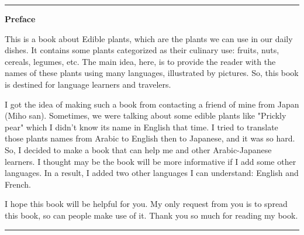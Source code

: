%
%
%

\newpage
\hrule
{}
{}
\begin{flushright}
{\huge \textbf{Preface}}
\end{flushright}
\vspace{1cm}

This is a book about Edible plants, which are the plants we can use in our daily dishes. 
It contains some plants categorized as their culinary use: fruits, nuts, cereals, legumes, etc. 
The main idea, here, is to provide the reader with the names of these plants using many languages, illustrated by pictures.
So, this book is destined for language learners and travelers.

I got the idea of making such a book from contacting a friend of mine from Japan (Miho san). 
Sometimes, we were talking about some edible plants like "Prickly pear" which I didn't know its name in English that time. 
I tried to translate those plants names from Arabic to English then to Japanese, and it was so hard.
So, I decided to make a book that can help me and other Arabic-Japanese learners. 
I thought may be the book will be more informative if I add some other languages.
In a result, I added two other languages I can understand: English and French.

I hope this book will be helpful for you. 
My only request from you is to spread this book, so can people make use of it.
Thank you so much for reading my book.

\newpage
\hrule
\begin{flushleft}
{\huge \textbf{}}
\end{flushleft}
\vspace{1cm}

